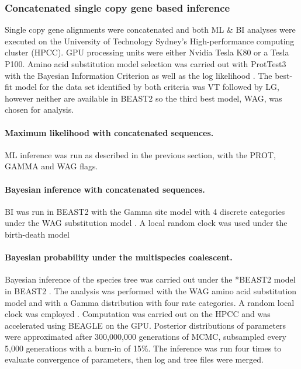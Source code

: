 \documentclass[12pt]{article}
\begin{document}
\subsubsection*{Concatenated single copy gene based inference}
Single copy gene alignments were concatenated and both ML \& BI analyses were executed on the University of Technology Sydney's High-performance computing cluster (HPCC). 
GPU processing units were either Nvidia Tesla K80 or a Tesla P100. 
Amino acid substitution model selection was carried out with ProtTest3 with the Bayesian Information Criterion as well as the log likelihood \cite{darriba2011prottest,guindon2003simple}. 
The best-fit model for the data set identified by both criteria was VT followed by LG, however neither are available in BEAST2 so the third best model, WAG, was chosen for analysis. 
\paragraph*{Maximum likelihood with concatenated sequences.}
ML inference was run as described in the previous section, with the PROT, GAMMA and WAG flags.
\paragraph*{Bayesian inference with concatenated sequences.}
BI was run in BEAST2 with the Gamma site model with 4 discrete categories under the WAG substitution model \cite{whelan2001general}. A local random clock was used under the birth-death model %
 

\paragraph*{Bayesian probability under the multispecies coalescent.}
Bayesian inference of the species tree was carried out under the *BEAST2 model in BEAST2 \cite{bouckaert2014beast}. 
The analysis was performed with the WAG amino acid substitution model \cite{whelan2001general} and with a Gamma distribution with four rate categories. 
A random local clock was employed \cite{drummond2010bayesian}. 
Computation was carried out on the HPCC and was accelerated using BEAGLE \cite{ayres2011beagle} on the GPU. 
Posterior distributions of parameters were approximated after 300,000,000 generations of MCMC, subsampled every 5,000 generations with a burn-in of 15\%. 
The inference was run four times to evaluate convergence of parameters, then log and tree files were merged. 
\end{document}
